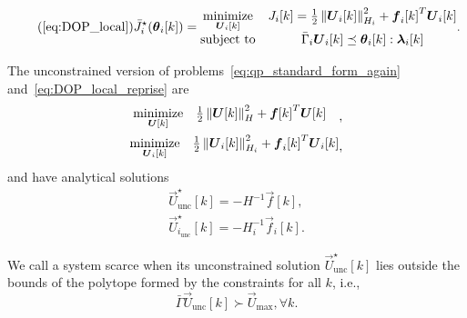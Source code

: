 \documentclass[../main.tex]{subfiles}
\begin{document}
\begin{equation}
  \label{eq:DOP_local_reprise}
  \tag{\ref*{eq:DOP_local}}
  \bar{J}_{i}^{\star}(\thetaik)=
  \begin{matrix}
    \minimize\limits_{\vec{U}_{i}[k]}&\obji=\frac{1}{2}\norm{\vec{U}_{i}[k]}^{2}_{H_{i}} + {\vec{f}_{i}[k]}^{T}\vec{U}_{i}[k]\\
    \mathrm{subject~ to} & \bar{\Gamma}_{i}\vec{U}_{i}[k] \preceq \thetaik:\lambdaik
  \end{matrix}.
\end{equation}

The unconstrained version of problems~\eqref{eq:qp_standard_form_again} and~\eqref{eq:DOP_local_reprise} are
\begin{align}
  \label{eq:qp_standard_form_unconstrained}
  \begin{aligned}
    \begin{matrix}
      \mathop{\textrm{minimize}}\limits_{\boldsymbol{U}[k]} &
                                                 \frac{1}{2}\left\lVert\boldsymbol{U}[k]\right\rVert^{2}_{H} + {\boldsymbol{f}[k]}^{T}\boldsymbol{U}[k] &\\
    \end{matrix},
  \end{aligned}\\
  \label{eq:DOP_local_unconstrained}
  \begin{aligned}
    \begin{matrix}
    \mathop{\textrm{minimize}}\limits_{\boldsymbol{U}_{i}[k]}&\frac{1}{2}\left\lVert\boldsymbol{U}_{i}[k]\right\rVert^{2}_{H_{i}} + {\boldsymbol{f}_{i}[k]}^{T}\boldsymbol{U}_{i}[k]\\
    \end{matrix},
  \end{aligned}
\end{align}
and have analytical solutions~\cite{BoydVandenberghe2004}
\begin{align}
  \label{eq:qp_standard_form_unconstrained_solution}
  \vec{U}_{\text{unc}}^{\star}[k]=-H^{-1}\vec{f}[k],\\
  \label{eq:DOP_local_unconstrained_solution}
  \vec{U}_{i_{\text{unc}}}^{\star}[k]=-H_{i}^{-1}\vec{f}_{i}[k].
\end{align}

We call a system scarce when its unconstrained solution $\vec{U}_{\text{unc}}^{\star}[k]$ lies outside the bounds of the polytope formed by the constraints for all $k$, i.e.,
\begin{equation}
\bar{\Gamma}\vec{U}_{\text{unc}}[k]\succ {\vec{U}}_{\text{max}}, \forall k.
\end{equation}
\end{document}
